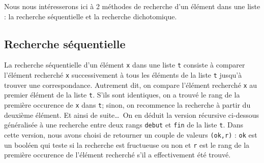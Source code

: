 Nous nous intéresserons ici à 2 méthodes de recherche d'un élément dans une liste :
la recherche séquentielle et la recherche dichotomique.

\subsection{Recherche séquentielle}\label{sub:rechercheSequentielle}
La recherche séquentielle d'un élément {\tt x} dans une liste {\tt t} 
consiste à comparer l'élément recherché {\tt x} successivement à tous les 
éléments de la liste {\tt t} jusqu'à trouver une correspondance.
Autrement dit, on compare l'élément recherché {\tt x} au premier élément
de la liste {\tt t}. S'ils sont identiques, on a trouvé le rang de la première 
occurence de {\tt x} dans {\tt t}; sinon, on recommence la recherche
à partir du deuxième élément. Et ainsi de suite\ldots\ On en déduit la version récursive ci-dessous
généralisée à une recherche entre deux rangs {\tt debut} et {\tt fin} de la liste {\tt t}.
Dans cette version, nous avons choisi de retourner un couple de
valeurs {\tt (ok,r)} : {\tt ok} est un booléen qui teste si la recherche est fructueuse ou non
et {\tt r} est le rang de la première occurence de l'élément recherché s'il a 
effectivement été trouvé.

